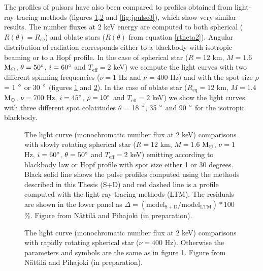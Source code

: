 \documentclass{wihuri}
\def\msun{{\rm M_{\odot}}}
\begin{document}
The profiles of pulsars have also been compared to profiles obtained from light-ray tracing methods (figures \ref{fig:jpulse1},\ref{fig:jpulse2} and \ref{fig:jpulse3}), which show very similar results.%
The number fluxes at 2 keV energy are computed to both spherical ($R(\theta) = R_{eq}$) and oblate stars ($R(\theta)$ from equation \ref{rtheta2}). Angular distribution of radiation corresponds either to a blackbody with isotropic beaming or to a Hopf profile. %
In the case of spherical star ($R = 12$ km, $M = 1.6$ $\msun$, $\theta = 50 \degree$, $i = 60 \degree$ and $T_{\mathrm{eff}} = 2$ keV) we compute the light curves with two different spinning frequencies ($\nu = 1$ Hz and $\nu$ = 400 Hz) and with the spot size $\rho$ = 1 $\degree$ or 30 $\degree$ (figures \ref{fig:jpulse1} and \ref{fig:jpulse2}). In the case of oblate star ($R_{\mathrm{eq}} = 12$ km, $M = 1.4$ $\msun$, $\nu = 700$ Hz, $i = 45 \degree$, $\rho = 10 \degree$ and $T_{\mathrm{eff}} = 2$ keV) we show the light curves with three different spot colatitudes $\theta$  = 18 $\degree$, 35 $\degree$ and 90 $\degree$ for the isotropic blackbody.





\begin{figure}
\centerline{}
\caption{The light curve (monochromatic number flux at 2 keV) comparisons with slowly rotating spherical star ($R = 12$ km, $M = 1.6$ $\msun$, $\nu = 1$ Hz, $i = 60 \degree$, $\theta = 50 \degree$ and $T_{\mathrm{eff}} = 2$ keV) emitting according to blackbody law or Hopf profile with spot size either 1 or 30 degrees. Black solid line shows the pulse profiles computed using the methods described in this Thesis (S+D) and red dashed line is a profile computed with the light-ray tracing methods (LTM). The residuals are shown in the lower panel as $\Delta = (\mathrm{model}_{\mathrm{S+D}}/\mathrm{model}_{\mathrm{LTM}})*100$ \%. Figure from Nättilä and Pihajoki (in preparation).
\label{fig:jpulse1}}
\end{figure}


\begin{figure}
\centerline{}
\caption{The light curve (monochromatic number flux at 2 keV) comparisons with rapidly rotating spherical star ($\nu = 400$ Hz). Otherwise the parameters and symbols are the same as in figure \ref{fig:jpulse1}. Figure from Nättilä and Pihajoki (in preparation).
\label{fig:jpulse2}}
\end{figure}
\end{document}

